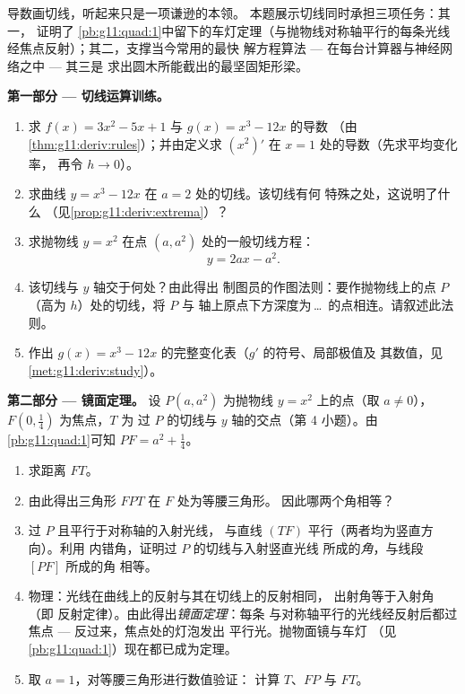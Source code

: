 \begin{problem}
\label{pb:g11:deriv:1}
导数画切线，听起来只是一项谦逊的本领。
本题展示切线同时承担三项任务：其一，
证明了
\cref{pb:g11:quad:1}中留下的车灯定理（与抛物线对称轴平行的每条光线
经焦点反射）；其二，支撑当今常用的最快
解方程算法 --- 在每台计算器与神经网络之中 ---
其三是
求出圆木所能截出的最坚固矩形梁。

\medskip
\noindent\textbf{第一部分 --- 切线运算训练。}
\begin{enumerate}
  \item 求 $f(x) = 3x^2 - 5x + 1$ 与
        $g(x) = x^3 - 12x$ 的导数
        （由\cref{thm:g11:deriv:rules}）；并由定义求 $\left(x^2
        \right)'$ 在 $x = 1$ 处的导数（先求平均变化率，
        再令 $h \to 0$）。
  \item 求曲线 $y = x^3 - 12x$ 在 $a = 2$ 处的切线。该切线有何
        特殊之处，这说明了什么
        （见\cref{prop:g11:deriv:extrema}）？
  \item 求抛物线 $y = x^2$
        在点 $(a, a^2)$ 处的一般切线方程：
        \[
        y = 2ax - a^2 .
        \]
  \item 该切线与 $y$ 轴交于何处？由此得出
        制图员的作图法则：要作抛物线上的点 $P$
        （高为 $h$）处的切线，将 $P$ 与
        轴上原点下方深度为\,\dots\ 的点相连。请叙述此法则。
  \item 作出
        $g(x) = x^3 - 12x$ 的完整变化表（$g'$ 的符号、局部极值及
        其数值，见\cref{met:g11:deriv:study}）。
\end{enumerate}

\medskip
\noindent\textbf{第二部分 --- 镜面定理。}
设 $P(a, a^2)$ 为抛物线 $y = x^2$ 上的点（取
$a \neq 0$），$F\left(0, \frac14\right)$ 为焦点，$T$ 为
过 $P$ 的切线与 $y$ 轴的交点（第
4 小题）。由\cref{pb:g11:quad:1}可知
$PF = a^2 + \frac14$。
\begin{enumerate}[resume]
  \item 求距离 $FT$。
  \item 由此得出三角形 $FPT$ 在 $F$ 处为等腰三角形。
        因此哪两个角相等？
  \item 过 $P$ 且平行于对称轴的入射光线，
        与直线 $(TF)$ 平行（两者均为竖直方向）。利用
        内错角，证明过 $P$ 的切线与入射竖直光线
        所成的\emph{角}，与线段 $[PF]$ 所成的角
        相等。
  \item 物理：光线在曲线上的反射与其在切线上的反射相同，
        出射角等于入射角（即
        反射定律）。由此得出\emph{镜面定理}：每条
        与对称轴平行的光线经反射后都过焦点 ---
        反过来，焦点处的灯泡发出
        平行光。抛物面镜与车灯
        （见\cref{pb:g11:quad:1}）现在都已成为定理。
  \item 取 $a = 1$，对等腰三角形进行数值验证：
        计算 $T$、$FP$ 与 $FT$。
\end{enumerate}


\end{problem}
